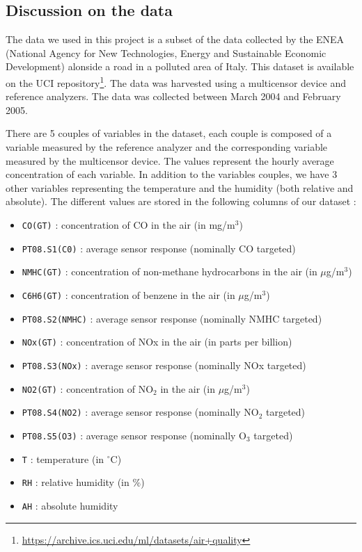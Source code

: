 \subsection{Discussion on the data}
The data we used in this project is a subset of the data collected by the ENEA (National Agency for New Technologies, Energy and Sustainable Economic Development)
alonside a road in a polluted area of Italy. This dataset is available on the UCI repository\footnote{\href{https://archive.ics.uci.edu/ml/datasets/air+quality}{https://archive.ics.uci.edu/ml/datasets/air+quality}}. The data was harvested using a multicensor device and reference analyzers. The data was collected between March 2004 and February 2005.

There are 5 couples of variables in the dataset, each couple is composed of a variable measured by the reference analyzer and the corresponding variable measured by the multicensor device.
The values represent the hourly average concentration of each variable. In addition to the variables couples, we have 3 other variables representing the temperature and the humidity (both relative and absolute).
The different values are stored in the following columns of our dataset :
\begin{itemize}
\item \texttt{CO(GT)} : concentration of CO in the air (in mg/m$^3$)
\item \texttt{PT08.S1(C0)} : average sensor response (nominally CO targeted)
\item \texttt{NMHC(GT)} : concentration of non-methane hydrocarbons in the air (in $\mu$g/m$^3$)
\item \texttt{C6H6(GT)} : concentration of benzene in the air (in $\mu$g/m$^3$)
\item \texttt{PT08.S2(NMHC)} : average sensor response (nominally NMHC targeted)
\item \texttt{NOx(GT)} : concentration of NOx in the air (in parts per billion)
\item \texttt{PT08.S3(NOx)} : average sensor response (nominally NOx targeted)
\item \texttt{NO2(GT)} : concentration of NO$_2$ in the air (in $\mu$g/m$^3$)
\item \texttt{PT08.S4(NO2)} : average sensor response (nominally NO$_2$ targeted)
\item \texttt{PT08.S5(O3)} : average sensor response (nominally O$_3$ targeted)
\item \texttt{T} : temperature (in $^{\circ}$C)
\item \texttt{RH} : relative humidity (in $\%$)
\item \texttt{AH} : absolute humidity
\end{itemize}

